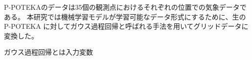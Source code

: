 P-POTEKAのデータは35個の観測点におけるそれぞれの位置での気象データである。
本研究では機械学習モデルが学習可能なデータ形式にするために、生のP-POTEKA
に対してガウス過程回帰と呼ばれる手法を用いてグリッドデータに変換した。

ガウス過程回帰とは入力変数
